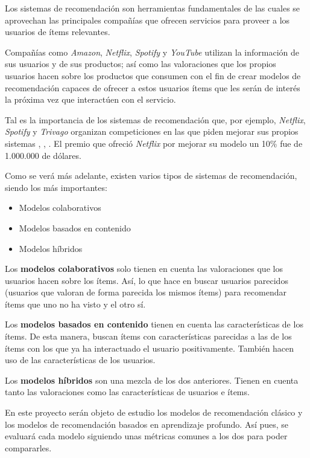 Los sistemas de recomendación son herramientas fundamentales de las cuales se aprovechan las principales compañías que ofrecen servicios para proveer a los usuarios de ítems relevantes.

Compañías como \textit{Amazon}, \textit{Netflix}, \textit{Spotify} y \textit{YouTube} utilizan la información de sus usuarios y de sus productos; así como las valoraciones que los propios usuarios hacen sobre los productos que consumen con el fin de crear modelos de recomendación capaces de ofrecer a estos usuarios ítems que les serán de interés la próxima vez que interactúen con el servicio.

Tal es la importancia de los sistemas de recomendación que, por ejemplo, \textit{Netflix}, \textit{Spotify} y \textit{Trivago} organizan competiciones en las que piden mejorar sus propios sistemas \cite{wiki:Netflix_Prize}, \cite{spotify}, \cite{trivago}. El premio que ofreció \textit{Netflix} por mejorar su modelo un 10\% fue de 1.000.000 de dólares.

Como se verá más adelante, existen varios tipos de sistemas de recomendación, siendo los más importantes:
\begin{itemize}
\tightlist
\item Modelos colaborativos
\item Modelos basados en contenido
\item Modelos híbridos
\end{itemize}
Los \textbf{modelos colaborativos} solo tienen en cuenta las valoraciones que los usuarios hacen sobre los ítems. Así, lo que hace en buscar usuarios parecidos (usuarios que valoran de forma parecida los mismos ítems) para recomendar ítems que uno no ha visto y el otro sí.

Los \textbf{modelos basados en contenido} tienen en cuenta las características de los ítems. De esta manera, buscan ítems con características parecidas a las de los ítems con los que ya ha interactuado el usuario positivamente. También hacen uso de las características de los usuarios.

Los \textbf{modelos híbridos} son una mezcla de los dos anteriores. Tienen en cuenta tanto las valoraciones como las características de usuarios e ítems.

En este proyecto serán objeto de estudio los modelos de recomendación clásico y los modelos de recomendación basados en aprendizaje profundo. Así pues, se evaluará cada modelo siguiendo unas métricas comunes a los dos para poder compararles.

